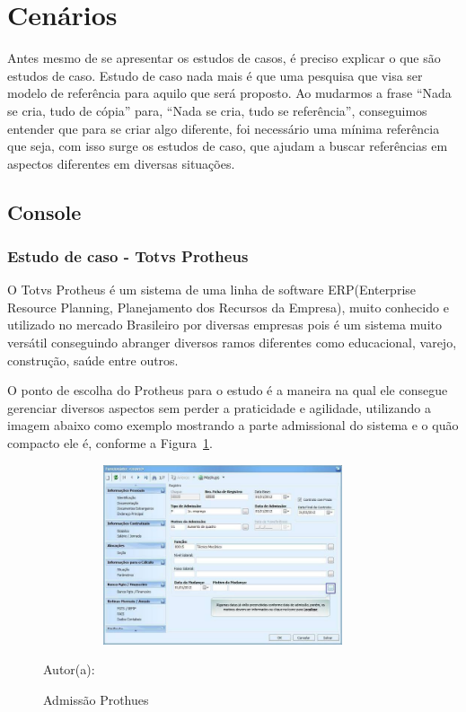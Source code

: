 \section{Cenários}
\vspace*{1cm}
Antes mesmo de se apresentar os estudos de casos, é preciso explicar o que são estudos de caso.
Estudo de caso nada mais é que uma pesquisa que visa ser modelo de referência para aquilo que será proposto. Ao mudarmos a frase “Nada se cria, tudo de cópia” para, “Nada se cria, tudo se referência”, conseguimos entender que para se criar algo diferente, foi necessário uma mínima referência que seja, com isso surge os estudos de caso, que ajudam a buscar referências em aspectos diferentes em diversas situações.

\subsection{Console}

\subsubsection{Estudo de caso - Totvs Protheus}

O Totvs Protheus é um sistema de uma linha de software ERP(Enterprise Resource Planning, Planejamento dos Recursos da Empresa), muito conhecido e utilizado no mercado Brasileiro por diversas empresas pois é um sistema muito versátil conseguindo abranger diversos ramos diferentes como educacional, varejo, construção, saúde entre outros.

O ponto de escolha do Protheus para o estudo é a maneira na qual ele consegue gerenciar diversos aspectos sem perder a praticidade e agilidade, utilizando a imagem abaixo como exemplo mostrando a parte admissional do sistema e o quão compacto ele é, conforme a Figura~\hypersetup{linkcolor=black}\ref{fig:Admissão}.
 
\begin{figure}[!h]
	\centering
	\caption{Admissão Prothues}
	\label{fig:Admissão}
	\includegraphics[width=400px, height=200px]{./images/prothues.jpeg}
	\par {Autor(a): \cite{prothues}}
\end{figure}

